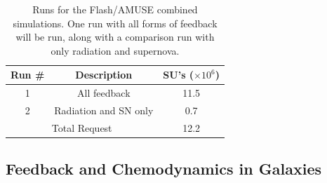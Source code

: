 \documentclass[11pt]{article}
\newcommand{\msun}{$\textrm{M}_{\odot}$}
\begin{document}

\begin{table}
\centering
\begin{tabular}{|c|c|c|}
\hline 
Run \# & %
             Description & SU's ($\times 10^6$) \\
\hline 
1 & %
       All feedback & 11.5 \\
\hline 
2 & %
     Radiation and SN only & 0.7 \\
\hline 
\hline
\multicolumn{2}{|c|}{Total Request} & 12.2 \\

\hline
\end{tabular}
\caption{\small Runs for the Flash/AMUSE combined simulations. One run with all forms of feedback will be run, along with a comparison run with only radiation and supernova.}
\end{table}





\subsection{Feedback and Chemodynamics in Galaxies}
\end{document}
